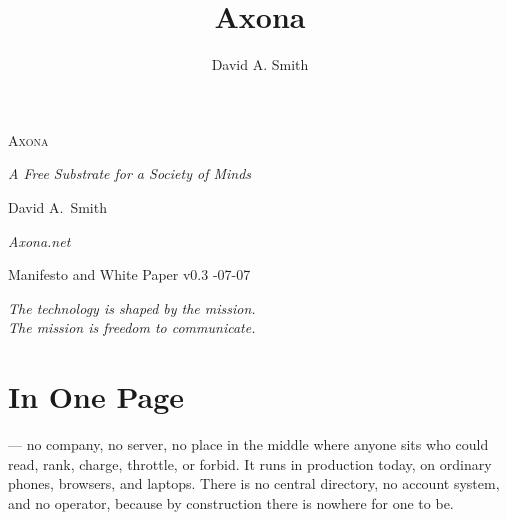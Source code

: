 \documentclass[nobib,justified]{tufte-handout}
\title{Axona}
\author[David A. Smith]{David A. Smith}
\date{}
\begin{document}
\thispagestyle{empty}
\null\vfill
\begin{center}
{\fontsize{52}{56}\selectfont \textsc{Axona}\par}
\vspace{0.7em}
{\Large\itshape A Free Substrate for a Society of Minds\par}
\vspace{3.5em}
{\large David A.~Smith\par}
{\itshape\small Axona.net\par}
\vspace{2em}
{\small Manifesto and White Paper \quad v0.3 -07-07\par}
\end{center}
\vfill
\null\newpage

\thispagestyle{empty}
\null\vfill
\begin{flushright}
\itshape The technology is shaped by the mission.\\[0.3em]
The mission is freedom to communicate.\par
\end{flushright}
\vfill
\null\newpage

\pagestyle{axonaplain}
\thispagestyle{axonaplain}
\setcounter{page}{1}

\section{In One Page}

 --- no company,
no server, no place in the middle where anyone sits who could read, rank,
charge, throttle, or forbid. It runs in production today, on ordinary
phones, browsers, and laptops. There is no central directory,
no account system, and no operator, because by construction there is nowhere
for one to be.
\end{document}
